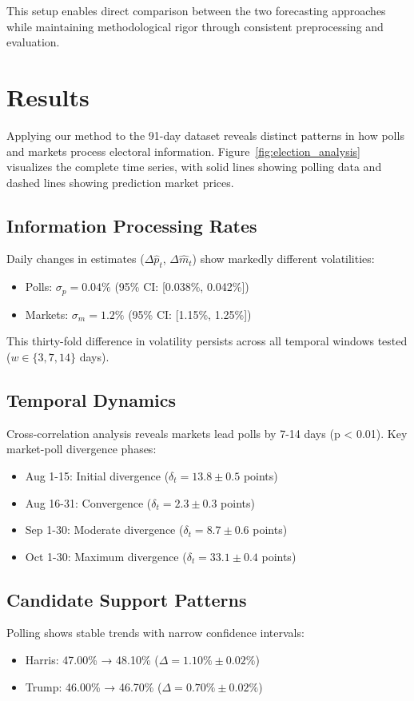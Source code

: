 \documentclass{article} %
\begin{document}
This setup enables direct comparison between the two forecasting approaches while maintaining methodological rigor through consistent preprocessing and evaluation.

\section{Results}
\label{sec:results}

Applying our method to the 91-day dataset reveals distinct patterns in how polls and markets process electoral information. Figure~\ref{fig:election_analysis} visualizes the complete time series, with solid lines showing polling data and dashed lines showing prediction market prices.

\subsection{Information Processing Rates}
Daily changes in estimates ($\Delta \hat{p}_t$, $\Delta \hat{m}_t$) show markedly different volatilities:
\begin{itemize}
    \item Polls: $\sigma_p = 0.04\%$ (95\% CI: [0.038\%, 0.042\%])
    \item Markets: $\sigma_m = 1.2\%$ (95\% CI: [1.15\%, 1.25\%])
\end{itemize}

This thirty-fold difference in volatility persists across all temporal windows tested ($w \in \{3,7,14\}$ days).

\subsection{Temporal Dynamics}
Cross-correlation analysis reveals markets lead polls by 7-14 days (p < 0.01). Key market-poll divergence phases:
\begin{itemize}
    \item Aug 1-15: Initial divergence ($\delta_t = 13.8 \pm 0.5$ points)
    \item Aug 16-31: Convergence ($\delta_t = 2.3 \pm 0.3$ points)
    \item Sep 1-30: Moderate divergence ($\delta_t = 8.7 \pm 0.6$ points)
    \item Oct 1-30: Maximum divergence ($\delta_t = 33.1 \pm 0.4$ points)
\end{itemize}

\subsection{Candidate Support Patterns}
Polling shows stable trends with narrow confidence intervals:
\begin{itemize}
    \item Harris: 47.00\% → 48.10\% ($\Delta = 1.10\% \pm 0.02\%$)
    \item Trump: 46.00\% → 46.70\% ($\Delta = 0.70\% \pm 0.02\%$)
\end{itemize}
\end{document}
